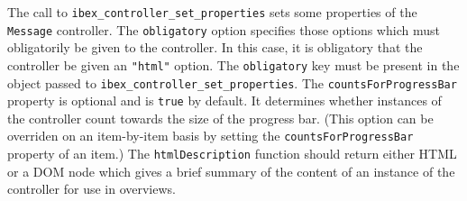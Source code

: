\documentclass[]{article}
\newenvironment{Shaded}{}{}
\newcommand{\KeywordTok}[1]{\textcolor[rgb]{0.00,0.44,0.13}{\textbf{{#1}}}}
\newcommand{\DataTypeTok}[1]{\textcolor[rgb]{0.56,0.13,0.00}{{#1}}}
\newcommand{\DecValTok}[1]{\textcolor[rgb]{0.25,0.63,0.44}{{#1}}}
\newcommand{\StringTok}[1]{\textcolor[rgb]{0.25,0.44,0.63}{{#1}}}
\newcommand{\CommentTok}[1]{\textcolor[rgb]{0.38,0.63,0.69}{\textit{{#1}}}}
\newcommand{\OtherTok}[1]{\textcolor[rgb]{0.00,0.44,0.13}{{#1}}}
\newcommand{\FunctionTok}[1]{\textcolor[rgb]{0.02,0.16,0.49}{{#1}}}
\newcommand{\NormalTok}[1]{{#1}}
\begin{document}
\begin{Shaded}
\end{Shaded}

The call to \texttt{ibex\_controller\_set\_properties} sets some
properties of the \texttt{Message} controller. The \texttt{obligatory}
option specifies those options which must obligatorily be given to the
controller. In this case, it is obligatory that the controller be given
an \texttt{"html"} option. The \texttt{obligatory} key must be present
in the object passed to \texttt{ibex\_controller\_set\_properties}. The
\texttt{countsForProgressBar} property is optional and is \texttt{true}
by default. It determines whether instances of the controller count
towards the size of the progress bar. (This option can be overriden on
an item-by-item basis by setting the \texttt{countsForProgressBar}
property of an item.) The \texttt{htmlDescription} function should
return either HTML or a DOM node which gives a brief summary of the
content of an instance of the controller for use in overviews.
\end{document}
